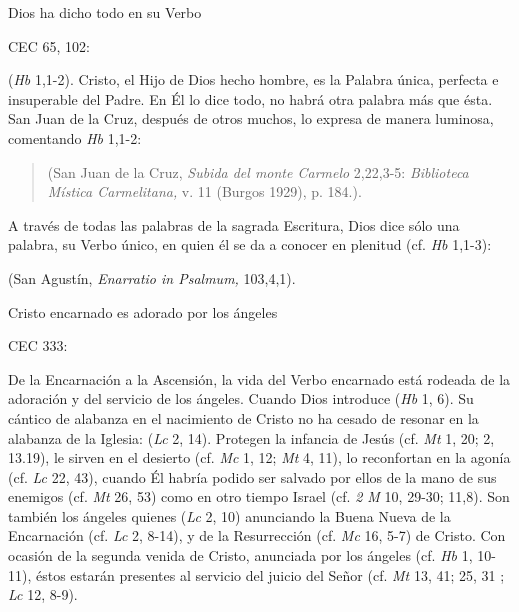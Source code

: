 	Dios ha dicho todo en su Verbo
	
	CEC 65, 102:
	
	  (\emph{Hb} 1,1-2). Cristo, el Hijo de Dios hecho hombre, es la Palabra única, perfecta e insuperable del Padre. En Él lo dice todo, no habrá otra palabra más que ésta. San Juan de la Cruz, después de otros muchos, lo expresa de manera luminosa, comentando \emph{Hb} 1,1-2:
	
	\begin{quote}
		 (San Juan de la Cruz, \emph{Subida del monte Carmelo} 2,22,3-5: \emph{Biblioteca Mística Carmelitana,} v. 11 (Burgos 1929), p. 184.).
	\end{quote}
	
	
	
	 A través de todas las palabras de la sagrada Escritura, Dios dice sólo una palabra, su Verbo único, en quien él se da a conocer en plenitud (cf. \emph{Hb} 1,1-3):
	
	 (San Agustín, \emph{Enarratio in Psalmum,} 103,4,1).
	
	Cristo encarnado es adorado por los ángeles
	
	CEC 333:
	
	 De la Encarnación a la Ascensión, la vida del Verbo encarnado está rodeada de la adoración y del servicio de los ángeles. Cuando Dios introduce  (\emph{Hb} 1, 6). Su cántico de alabanza en el nacimiento de Cristo no ha cesado de resonar en la alabanza de la Iglesia:  (\emph{Lc} 2, 14). Protegen la infancia de Jesús (cf. \emph{Mt} 1, 20; 2, 13.19), le sirven en el desierto (cf. \emph{Mc} 1, 12; \emph{Mt} 4, 11), lo reconfortan en la agonía (cf. \emph{Lc} 22, 43), cuando Él habría podido ser salvado por ellos de la mano de sus enemigos (cf. \emph{Mt} 26, 53) como en otro tiempo Israel (cf. \emph{2 M} 10, 29-30; 11,8). Son también los ángeles quienes  (\emph{Lc} 2, 10) anunciando la Buena Nueva de la Encarnación (cf. \emph{Lc} 2, 8-14), y de la Resurrección (cf. \emph{Mc} 16, 5-7) de Cristo. Con ocasión de la segunda venida de Cristo, anunciada por los ángeles (cf. \emph{Hb} 1, 10-11), éstos estarán presentes al servicio del juicio del Señor (cf. \emph{Mt} 13, 41; 25, 31 ; \emph{Lc} 12, 8-9).
	
